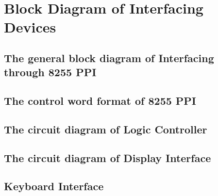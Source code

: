 \documentclass[12pt]{report}
\begin{document}
\renewcommand{\thesection}{A}
\section{Block Diagram of Interfacing Devices}
\subsection{The general block diagram of Interfacing through 8255 PPI}
\begin{figure}[h]
  \begin{center}
    
  \end{center}
\end{figure}

\newpage
\subsection{The control word format of 8255 PPI}
\begin{figure}[h]
  \begin{center}
    
  \end{center}
\end{figure}

\newpage
\subsection{The circuit diagram of Logic Controller}
\begin{figure}[h]
  \scalebox{0.9}{
    
  }
\end{figure}

\newpage
\subsection{The circuit diagram of Display Interface}
\begin{figure}[H]
  \scalebox{0.5}{
    
  }
\end{figure}
\begin{figure}[H]
  \scalebox{0.6}{
    
  }
\end{figure}

\newpage
\subsection{Keyboard Interface}
\begin{figure}[H]
  \scalebox{0.9}{
    
  }
\end{figure}
\end{document}

